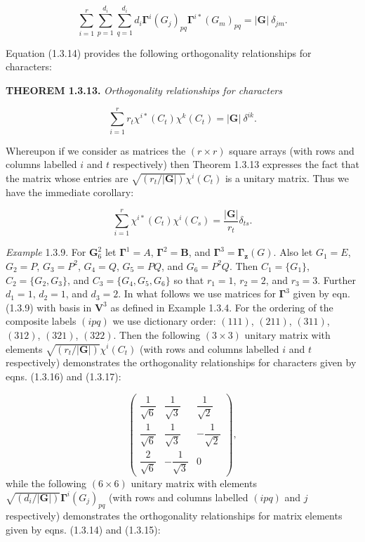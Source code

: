 \documentclass[11pt,a4paper,twoside,openright]{book}
\begin{document}
\begin{equation*}
\sum_{i=1}^{r}\sum_{p=1}^{d_{i}}\sum_{q=1}^{d_{i}} d_{i}\boldsymbol{\Gamma}^{i}(G_{j})_{pq}\boldsymbol{\Gamma}^{i*}(G_{m})_{pq} = |\mathbf{G}|\ \delta_{jm}. \tag{1.3.15}
\end{equation*}

Equation (1.3.14) provides the following orthogonality relationships for characters:

\textbf{THEOREM 1.3.13.} \textit{Orthogonality relationships for characters}

\begin{equation*}
\sum_{i=1}^{r} r_{t}\chi^{i*}(C_{t})\chi^{k}(C_{t}) = |\mathbf{G}|\ \delta^{ik}. \tag{1.3.16}
\end{equation*}

Whereupon if we consider as matrices the $(r \times r)$ square arrays (with rows and columns labelled $i$ and $t$ respectively) then Theorem 1.3.13 expresses the fact that the matrix whose entries are $\sqrt{(r_{t}/|\mathbf{G}|)}\chi^{i}(C_{t})$ is a unitary matrix. Thus we have the immediate corollary:

\begin{equation*}
\sum_{i=1}^{r} \chi^{i*}(C_{t})\chi^{i}(C_{s}) = \frac{|\mathbf{G}|}{r_{t}}\delta_{ts}. \tag{1.3.17}
\end{equation*}

\textit{Example} 1.3.9. For $\mathbf{G}_6^2$ let $\boldsymbol{\Gamma}^{1} = A$, $\boldsymbol{\Gamma}^{2} = \mathbf{B}$, and $\boldsymbol{\Gamma}^{3} = \boldsymbol{\Gamma}_{\mathbf{z}}(G)$. Also let $G_{1} = E$, $G_{2} = P$, $G_{3} = P^{2}$, $G_{4} = Q$, $G_{5} = PQ$, and $G_{6} = P^{2}Q$. Then $C_{1} = \{G_{1}\}$, $C_{2} = \{G_{2}, G_{3}\}$, and $C_{3} = \{G_{4}, G_{5}, G_{6}\}$ so that $r_{1} = 1$, $r_{2} = 2$, and $r_{3} = 3$. Further $d_{1} = 1$, $d_{2} = 1$, and $d_{3} = 2$. In what follows we use matrices for $\boldsymbol{\Gamma}^{3}$ given by eqn. (1.3.9) with basis in $\mathbf{V}^{3}$ as defined in Example 1.3.4. For the ordering of the composite labels $(ipq)$ we use dictionary order: $(111)$, $(211)$, $(311)$, $(312)$, $(321)$, $(322)$. Then the following $(3 \times 3)$ unitary matrix with elements $\sqrt{(r_{t}/|\mathbf{G}|)}\chi^{i}(C_{t})$ (with rows and columns labelled $i$ and $t$ respectively) demonstrates the orthogonality relationships for characters given by eqns. (1.3.16) and (1.3.17):

\begin{equation*}
\begin{pmatrix} \dfrac{1}{\sqrt{6}} & \dfrac{1}{\sqrt{3}} & \dfrac{1}{\sqrt{2}} \\[2mm] \dfrac{1}{\sqrt{6}} & \dfrac{1}{\sqrt{3}} & -\dfrac{1}{\sqrt{2}} \\[2mm] \dfrac{2}{\sqrt{6}} & -\dfrac{1}{\sqrt{3}} & 0 \end{pmatrix},
\end{equation*}
 while the following $(6 \times 6)$ unitary matrix with elements $\sqrt{(d_{i}/|\mathbf{G}|)}\boldsymbol{\Gamma}^{i}(G_{j})_{pq}$ (with rows and columns labelled $(ipq)$ and $j$ respectively) demonstrates the orthogonality relationships for matrix elements given by eqns. (1.3.14) and (1.3.15):
\end{document}
